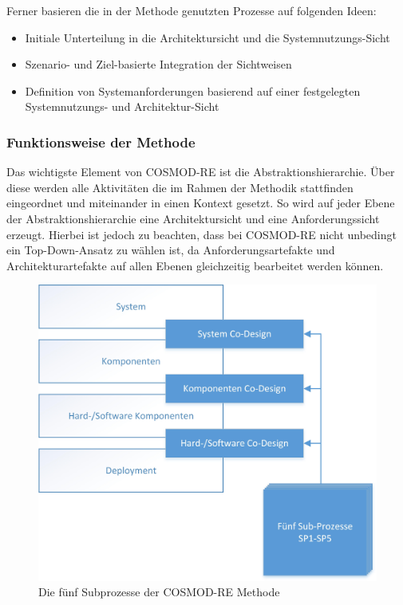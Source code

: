 Ferner basieren die in der Methode genutzten Prozesse auf folgenden Ideen: \cite{Poh01} \\

\begin{itemize}
\item Initiale Unterteilung in die Architektursicht und die Systemnutzungs-Sicht
\item Szenario- und Ziel-basierte Integration der Sichtweisen
\item Definition von Systemanforderungen basierend auf einer festgelegten Systemnutzungs- und Architektur-Sicht \\
\end{itemize}

\subsubsection{Funktionsweise der Methode}
Das wichtigste Element von COSMOD-RE ist die Abstraktionshierarchie. \"Uber diese werden alle Aktivit\"aten die im Rahmen der Methodik stattfinden eingeordnet und miteinander in einen Kontext gesetzt. So wird auf jeder Ebene der Abstraktionshierarchie eine Architektursicht und eine Anforderungssicht erzeugt. Hierbei ist jedoch zu beachten, dass bei COSMOD-RE nicht unbedingt ein Top-Down-Ansatz zu w\"ahlen ist, da Anforderungsartefakte und Architekturartefakte auf allen Ebenen gleichzeitig bearbeitet werden k\"onnen.\\

\begin{figure}[h]
	\centering
	\includegraphics[scale=0.75]{COSMODREoverview.jpg} 
	\caption{Die f\"unf Subprozesse der COSMOD-RE Methode}\label{cosmodreow}
\end{figure}

